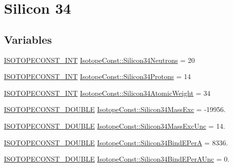 \hypertarget{group___isotope_const-_silicon-_si34}{}\section{Silicon 34}
\label{group___isotope_const-_silicon-_si34}
\subsection*{Variables}
\begin{DoxyCompactItemize}
\item 
\mbox{\hyperlink{group___isotope_const-_macros_ga5f18360b3e99483a35c32d789e62621c}{I\+S\+O\+T\+O\+P\+E\+C\+O\+N\+S\+T\+\_\+\+I\+NT}} \mbox{\hyperlink{group___isotope_const-_silicon-_si34_ga1384ef107c397893aadfb8d3172bbf50}{Isotope\+Const\+::\+Silicon34\+Neutrons}} = 20
\item 
\mbox{\hyperlink{group___isotope_const-_macros_ga5f18360b3e99483a35c32d789e62621c}{I\+S\+O\+T\+O\+P\+E\+C\+O\+N\+S\+T\+\_\+\+I\+NT}} \mbox{\hyperlink{group___isotope_const-_silicon-_si34_ga269a11c0544f366a5f5824293e4ddcc9}{Isotope\+Const\+::\+Silicon34\+Protons}} = 14
\item 
\mbox{\hyperlink{group___isotope_const-_macros_ga5f18360b3e99483a35c32d789e62621c}{I\+S\+O\+T\+O\+P\+E\+C\+O\+N\+S\+T\+\_\+\+I\+NT}} \mbox{\hyperlink{group___isotope_const-_silicon-_si34_ga01faed44eb196df4d3f01edffc4d335a}{Isotope\+Const\+::\+Silicon34\+Atomic\+Weight}} = 34
\item 
\mbox{\hyperlink{group___isotope_const-_macros_ga8f45a7272ce02c0b4c65c44636ed719a}{I\+S\+O\+T\+O\+P\+E\+C\+O\+N\+S\+T\+\_\+\+D\+O\+U\+B\+LE}} \mbox{\hyperlink{group___isotope_const-_silicon-_si34_ga9ef3fdd6d11e0f8cef8f353fb173c4d9}{Isotope\+Const\+::\+Silicon34\+Mass\+Exc}} = -\/19956.
\item 
\mbox{\hyperlink{group___isotope_const-_macros_ga8f45a7272ce02c0b4c65c44636ed719a}{I\+S\+O\+T\+O\+P\+E\+C\+O\+N\+S\+T\+\_\+\+D\+O\+U\+B\+LE}} \mbox{\hyperlink{group___isotope_const-_silicon-_si34_gaeb0502ed78b029a79ab0e73f0ef0b07e}{Isotope\+Const\+::\+Silicon34\+Mass\+Exc\+Unc}} = 14.
\item 
\mbox{\hyperlink{group___isotope_const-_macros_ga8f45a7272ce02c0b4c65c44636ed719a}{I\+S\+O\+T\+O\+P\+E\+C\+O\+N\+S\+T\+\_\+\+D\+O\+U\+B\+LE}} \mbox{\hyperlink{group___isotope_const-_silicon-_si34_gae561156e32b400a65378e7389297f8a7}{Isotope\+Const\+::\+Silicon34\+Bind\+E\+PerA}} = 8336.
\item 
\mbox{\hyperlink{group___isotope_const-_macros_ga8f45a7272ce02c0b4c65c44636ed719a}{I\+S\+O\+T\+O\+P\+E\+C\+O\+N\+S\+T\+\_\+\+D\+O\+U\+B\+LE}} \mbox{\hyperlink{group___isotope_const-_silicon-_si34_ga6d6098e562a1841bcb451eec572e3817}{Isotope\+Const\+::\+Silicon34\+Bind\+E\+Per\+A\+Unc}} = 0.

\end{DoxyCompactItemize}
